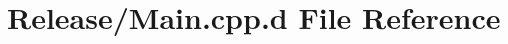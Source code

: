 \hypertarget{_release_2_main_8cpp_8d}{\section{\-Release/\-Main.cpp.\-d \-File \-Reference}
\label{_release_2_main_8cpp_8d}
}
